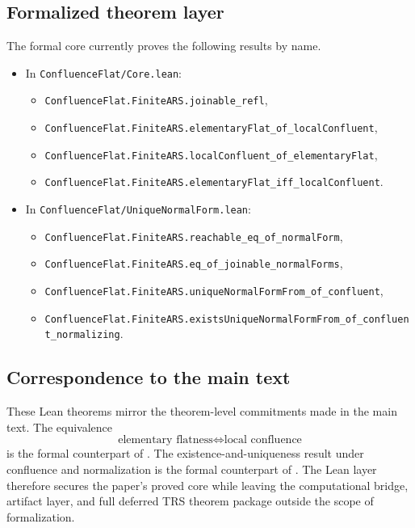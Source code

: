 \documentclass[11pt]{article}
\numberwithin{equation}{section}
\newcommand{\code}[1]{\nolinkurl{#1}}
\theoremstyle{definition}
\theoremstyle{remark}
\begin{document}
\subsection{Formalized theorem layer}

The formal core currently proves the following results by name.
\begin{sloppypar}
\begin{itemize}[leftmargin=1.5em]
    \item In \code{ConfluenceFlat/Core.lean}:
    \begin{itemize}[leftmargin=1.5em]
        \item \code{ConfluenceFlat.FiniteARS.joinable_refl},
        \item \code{ConfluenceFlat.FiniteARS.elementaryFlat_of_localConfluent},
        \item \code{ConfluenceFlat.FiniteARS.localConfluent_of_elementaryFlat},
        \item \code{ConfluenceFlat.FiniteARS.elementaryFlat_iff_localConfluent}.
    \end{itemize}
    \item In \code{ConfluenceFlat/UniqueNormalForm.lean}:
    \begin{itemize}[leftmargin=1.5em]
        \item \code{ConfluenceFlat.FiniteARS.reachable_eq_of_normalForm},
        \item \code{ConfluenceFlat.FiniteARS.eq_of_joinable_normalForms},
        \item \code{ConfluenceFlat.FiniteARS.uniqueNormalFormFrom_of_confluent},
        \item \mbox{\texttt{ConfluenceFlat.FiniteARS.existsUnique}}\texttt{NormalFormFrom\_of\_confluent\_normalizing}.
    \end{itemize}
\end{itemize}
\end{sloppypar}

\subsection{Correspondence to the main text}

These Lean theorems mirror the theorem-level commitments made in the main text. The equivalence
\[
\text{elementary flatness} \iff \text{local confluence}
\]
is the formal counterpart of . The existence-and-uniqueness result under confluence and normalization is the formal counterpart of . The Lean layer therefore secures the paper's proved core while leaving the computational bridge, artifact layer, and full deferred TRS theorem package outside the scope of formalization.
\end{document}
